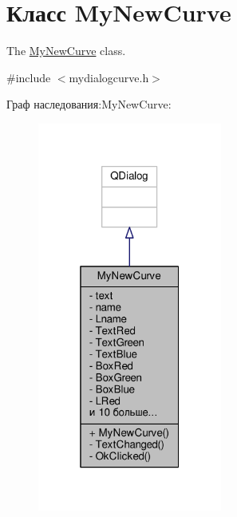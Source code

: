 \hypertarget{class_my_new_curve}{}\section{Класс My\+New\+Curve}
\label{class_my_new_curve}


The \hyperlink{class_my_new_curve}{My\+New\+Curve} class.  




{\ttfamily \#include $<$mydialogcurve.\+h$>$}



Граф наследования\+:My\+New\+Curve\+:\nopagebreak
\begin{figure}[H]
\begin{center}
\leavevmode
\includegraphics[width=172pt]{class_my_new_curve__inherit__graph}
\end{center}
\end{figure}


